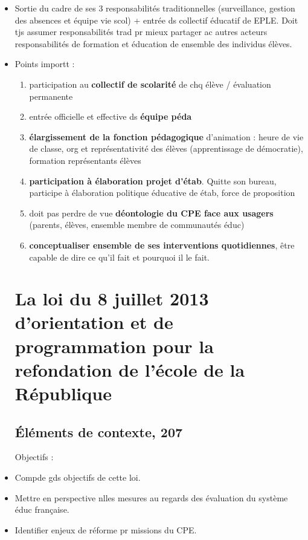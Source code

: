 \documentclass[12pt]{report}
\begin{document}
\begin{itemize}
\begin{enumerate}
\end{enumerate}

\item Sortie du cadre de ses 3 responsabilités traditionnelles (surveillance, gestion des absences et équipe vie scol) + entrée ds collectif éducatif de EPLE. Doit tjs assumer responsabilités trad pr mieux partager ac autres acteurs responsabilités de formation et éducation de ensemble des individus élèves. \\

\item Points importt : 
\begin{enumerate}
\item participation au \textbf{collectif de scolarité} de chq élève / évaluation permanente \\
\item entrée officielle et effective ds \textbf{équipe péda} \\
\item \textbf{ élargissement de la fonction pédagogique} d'animation  : heure de vie de classe, org et représentativité des élèves (apprentissage de démocratie), formation représentants élèves \\
\item \textbf{participation à élaboration projet d'étab}. Quitte son bureau, participe à élaboration politique éducative de étab, force de proposition \\
\item doit pas perdre de vue \textbf{déontologie du CPE face aux usagers} (parents, élèves, ensemble membre de communautés éduc) \\
\item \textbf{conceptualiser ensemble de ses interventions quotidiennes}, être capable de dire ce qu'il fait et pourquoi il le fait. \\

\end{enumerate}

\part{La loi du 8 juillet 2013 d'orientation et de programmation pour la refondation de l'école de la République}

\chapter{Éléments de contexte, 207}

Objectifs : \\
\item Compde gds objectifs de cette loi. \\
\item Mettre en perspective nlles mesures au regards des évaluation du système éduc française. \\
\item Identifier enjeux de réforme pr missions du CPE. \\


\end{itemize}
\end{document}
